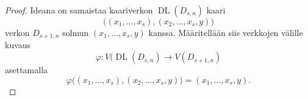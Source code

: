 \documentclass[finnish]{tktltiki2}
\theoremstyle{definition}
\theoremstyle{remark}
\DeclareMathOperator{\DL}{DL}
\newcommand{\Dsn}{D_{s,n}}
\newcommand{\Dssn}{D_{s+1,n}}
\begin{document}
\begin{proof}
    Ideana on samaistaa kaariverkon $\DL(\Dsn)$ kaari
    \begin{equation*}
        \big(
            (x_1, \dots, x_s), (x_2, \dots, x_s, y)
        \big)
    \end{equation*}
    verkon $\Dssn$ solmun $(x_1, \dots, x_s, y)$ kanssa. Määritellään
    siis verkkojen välille kuvaus
    \begin{equation*}
        \varphi \colon V(\DL(\Dsn) \to V(D_{s + 1, n})
    \end{equation*}
    asettamalla
    \begin{equation*}
        \varphi\big(
                   (x_1, \dots, x_s), (x_2, \dots, x_s, y)
               \big) = (x_1, \dots, x_s, y).
    \end{equation*}


\end{proof}
\end{document}

